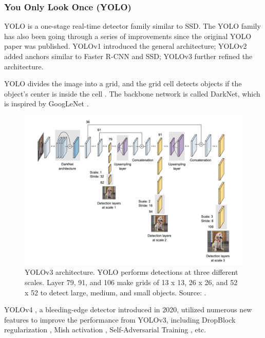\documentclass[a4paper, 11pt, oneside]{article}
\begin{document}
\subsubsection{You Only Look Once (YOLO)}

YOLO is a one-stage real-time detector family similar to SSD. The YOLO family has also been going through a series of
improvements since the original YOLO paper was published. YOLOv1 \cite{redmon2016you} introduced the general
architecture; YOLOv2 \cite{redmon2017yolo9000} added anchors similar to Faster R-CNN and SSD; YOLOv3
\cite{redmon2018yolov3} further refined the architecture.

YOLO divides the image into a grid, and the grid cell detects objects if the object's center is inside the cell
\cite{redmon2016you}. The backbone network is called DarkNet, which is inspired by GoogLeNet
\cite{elgendy2020deep, redmon2016you}.

\begin{figure}[ht]
  \begin{center}
    \includegraphics[width=\textwidth]{yolov3.png}
  \end{center}
  \caption{YOLOv3 architecture. YOLO performs detections at three different scales. Layer 79, 91, and 106 make grids of
  13 x 13, 26 x 26, and 52 x 52 to detect large, medium, and small objects. Source: \cite{elgendy2020deep}.}
\end{figure}

YOLOv4 \cite{bochkovskiy2020yolov4}, a bleeding-edge detector introduced in 2020, utilized numerous new features to
improve the performance from YOLOv3, including DropBlock regularization \cite{ghiasi2018dropblock}, Mish activation
\cite{misra2019mish}, Self-Adversarial Training \cite{bochkovskiy2020yolov4}, etc.
\end{document}
